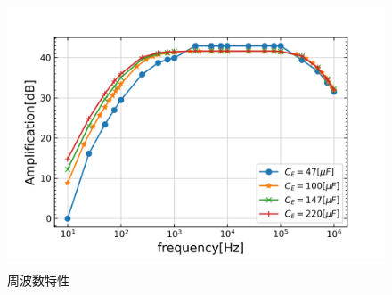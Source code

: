 \documentclass[10pt, a4j, dvipdfmx]{jarticle}
\begin{document}
    \begin{figure}[H]
        \centering
        \includegraphics[height=80mm]{ex-16.png}
        \caption{周波数特性}
        \label{ex:16}
    \end{figure}


    
\end{document}
